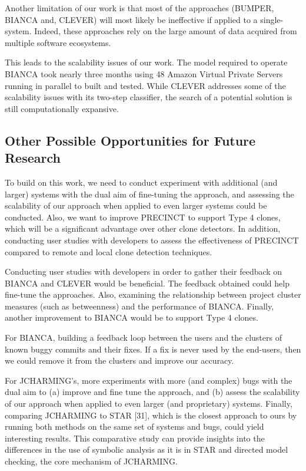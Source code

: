 \documentclass[12pt]{report}
\begin{document}
Another limitation of our work is that most of the approaches (BUMPER,
BIANCA and, CLEVER) will most likely be ineffective if applied to a
single-system. Indeed, these approaches rely on the large amount of data
acquired from multiple software ecosystems.

This leads to the scalability issues of our work. The model required to
operate BIANCA took nearly three months using 48 Amazon Virtual Private
Servers running in parallel to built and tested. While CLEVER addresses
some of the scalability issues with its two-step classifier, the search
of a potential solution is still computationally expansive.

\subsection{Other Possible Opportunities for Future
Research}\label{other-possible-opportunities-for-future-research}

To build on this work, we need to conduct experiment with additional (and
larger) systems with the dual aim of fine-tuning the approach, and
assessing the scalability of our approach when applied to even larger
systems could be conducted. Also, we want to improve PRECINCT to
support Type 4 clones, which will be a significant advantage over other
clone detectors. In addition, conducting user studies with developers to
assess the effectiveness of PRECINCT compared to remote and
local clone detection techniques.

Conducting user studies with developers in order to gather their
feedback on BIANCA and CLEVER would be beneficial. The feedback obtained
could help fine-tune the approaches. Also, examining the relationship
between project cluster measures (such as betweenness) and the
performance of BIANCA. Finally, another improvement to BIANCA would be
to support Type 4 clones.

For BIANCA, building a feedback loop between the users and the clusters
of known buggy commits and their fixes. If a fix is never used by the
end-users, then we could remove it from the clusters and improve our
accuracy.

For JCHARMING's, more experiments with more (and complex) bugs with the
dual aim to (a) improve and fine tune the approach, and (b) assess the
scalability of our approach when applied to even larger (and
proprietary) systems. Finally, comparing JCHARMING to STAR {[}31{]},
which is the closest approach to ours by running both methods on the
same set of systems and bugs, could yield interesting results. This
comparative study can provide insights into the differences in the use
of symbolic analysis as it is in STAR and directed model checking, the
core mechanism of JCHARMING.
\end{document}
